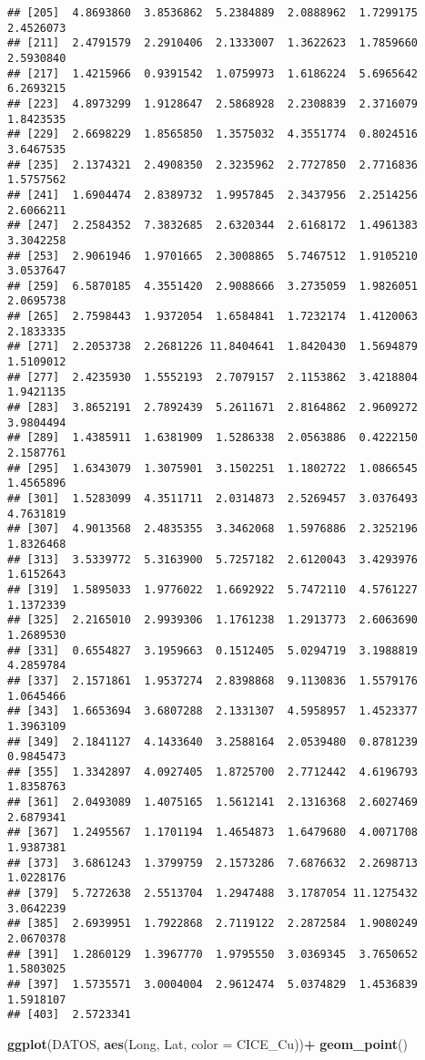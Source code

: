 \documentclass[
]{article}
\newenvironment{Shaded}{\begin{snugshade}}{\end{snugshade}}
\newcommand{\DataTypeTok}[1]{\textcolor[rgb]{0.13,0.29,0.53}{#1}}
\newcommand{\KeywordTok}[1]{\textcolor[rgb]{0.13,0.29,0.53}{\textbf{#1}}}
\newcommand{\NormalTok}[1]{#1}
\newcommand{\OperatorTok}[1]{\textcolor[rgb]{0.81,0.36,0.00}{\textbf{#1}}}
\newcommand{\StringTok}[1]{\textcolor[rgb]{0.31,0.60,0.02}{#1}}
\begin{document}
\begin{verbatim}
## [205]  4.8693860  3.8536862  5.2384889  2.0888962  1.7299175  2.4526073
## [211]  2.4791579  2.2910406  2.1333007  1.3622623  1.7859660  2.5930840
## [217]  1.4215966  0.9391542  1.0759973  1.6186224  5.6965642  6.2693215
## [223]  4.8973299  1.9128647  2.5868928  2.2308839  2.3716079  1.8423535
## [229]  2.6698229  1.8565850  1.3575032  4.3551774  0.8024516  3.6467535
## [235]  2.1374321  2.4908350  2.3235962  2.7727850  2.7716836  1.5757562
## [241]  1.6904474  2.8389732  1.9957845  2.3437956  2.2514256  2.6066211
## [247]  2.2584352  7.3832685  2.6320344  2.6168172  1.4961383  3.3042258
## [253]  2.9061946  1.9701665  2.3008865  5.7467512  1.9105210  3.0537647
## [259]  6.5870185  4.3551420  2.9088666  3.2735059  1.9826051  2.0695738
## [265]  2.7598443  1.9372054  1.6584841  1.7232174  1.4120063  2.1833335
## [271]  2.2053738  2.2681226 11.8404641  1.8420430  1.5694879  1.5109012
## [277]  2.4235930  1.5552193  2.7079157  2.1153862  3.4218804  1.9421135
## [283]  3.8652191  2.7892439  5.2611671  2.8164862  2.9609272  3.9804494
## [289]  1.4385911  1.6381909  1.5286338  2.0563886  0.4222150  2.1587761
## [295]  1.6343079  1.3075901  3.1502251  1.1802722  1.0866545  1.4565896
## [301]  1.5283099  4.3511711  2.0314873  2.5269457  3.0376493  4.7631819
## [307]  4.9013568  2.4835355  3.3462068  1.5976886  2.3252196  1.8326468
## [313]  3.5339772  5.3163900  5.7257182  2.6120043  3.4293976  1.6152643
## [319]  1.5895033  1.9776022  1.6692922  5.7472110  4.5761227  1.1372339
## [325]  2.2165010  2.9939306  1.1761238  1.2913773  2.6063690  1.2689530
## [331]  0.6554827  3.1959663  0.1512405  5.0294719  3.1988819  4.2859784
## [337]  2.1571861  1.9537274  2.8398868  9.1130836  1.5579176  1.0645466
## [343]  1.6653694  3.6807288  2.1331307  4.5958957  1.4523377  1.3963109
## [349]  2.1841127  4.1433640  3.2588164  2.0539480  0.8781239  0.9845473
## [355]  1.3342897  4.0927405  1.8725700  2.7712442  4.6196793  1.8358763
## [361]  2.0493089  1.4075165  1.5612141  2.1316368  2.6027469  2.6879341
## [367]  1.2495567  1.1701194  1.4654873  1.6479680  4.0071708  1.9387381
## [373]  3.6861243  1.3799759  2.1573286  7.6876632  2.2698713  1.0228176
## [379]  5.7272638  2.5513704  1.2947488  3.1787054 11.1275432  3.0642239
## [385]  2.6939951  1.7922868  2.7119122  2.2872584  1.9080249  2.0670378
## [391]  1.2860129  1.3967770  1.9795550  3.0369345  3.7650652  1.5803025
## [397]  1.5735571  3.0004004  2.9612474  5.0374829  1.4536839  1.5918107
## [403]  2.5723341
\end{verbatim}

\begin{Shaded}
\begin{Highlighting}[]
\KeywordTok{ggplot}\NormalTok{(DATOS, }\KeywordTok{aes}\NormalTok{(Long, Lat, }\DataTypeTok{color =}\NormalTok{ CICE_Cu))}\OperatorTok{+}
\StringTok{  }\KeywordTok{geom_point}\NormalTok{()}
\end{Highlighting}
\end{Shaded}
\end{document}
